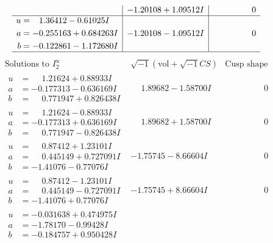 \documentclass[1p]{elsarticle_modified}
\theoremstyle{definition}
\newcommand{\I}{\sqrt{-1}}
\begin{document}
$$\begin{array}{c|c|c}
 & -1.20108 + 1.09512 I & \phantom{-0.000000 } 0 \\ \hline\begin{aligned}
u &= \phantom{-}1.36412 - 0.61025 I \\
a &= -0.255163 + 0.684263 I \\
b &= -0.122861 - 1.172680 I\end{aligned}
 & -1.20108 - 1.09512 I & \phantom{-0.000000 } 0\\
 \hline 
 \end{array}$$\newpage$$\begin{array}{c|c|c}  
\text{Solutions to }I^u_{2}& \I (\text{vol} + \sqrt{-1}CS) & \text{Cusp shape}\\
 \hline 
\begin{aligned}
u &= \phantom{-}1.21624 + 0.88933 I \\
a &= -0.177313 - 0.636169 I \\
b &= \phantom{-}0.771947 + 0.826438 I\end{aligned}
 & \phantom{-}1.89682 - 1.58700 I & \phantom{-0.000000 } 0 \\ \hline\begin{aligned}
u &= \phantom{-}1.21624 - 0.88933 I \\
a &= -0.177313 + 0.636169 I \\
b &= \phantom{-}0.771947 - 0.826438 I\end{aligned}
 & \phantom{-}1.89682 + 1.58700 I & \phantom{-0.000000 } 0 \\ \hline\begin{aligned}
u &= \phantom{-}0.87412 + 1.23101 I \\
a &= \phantom{-}0.445149 + 0.727091 I \\
b &= -1.41076 - 0.77076 I\end{aligned}
 & -1.75745 - 8.66604 I & \phantom{-0.000000 } 0 \\ \hline\begin{aligned}
u &= \phantom{-}0.87412 - 1.23101 I \\
a &= \phantom{-}0.445149 - 0.727091 I \\
b &= -1.41076 + 0.77076 I\end{aligned}
 & -1.75745 + 8.66604 I & \phantom{-0.000000 } 0 \\ \hline\begin{aligned}
u &= -0.031638 + 0.474975 I \\
a &= -1.78170 - 0.99428 I \\
b &= -0.184757 + 0.950428 I\end{aligned}

\end{array}$$
\end{document}
